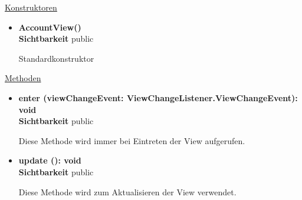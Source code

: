 \underline{Konstruktoren}
\begin{itemize}
\itemsep0pt
\item \textbf{AccountView()} \hfill\\
\textbf{Sichtbarkeit} public

Standardkonstruktor
\end{itemize}

\underline{Methoden}
\begin{itemize}
\itemsep0pt
\item \textbf{enter (viewChangeEvent: ViewChangeListener.ViewChangeEvent): void}\hfill\\
\textbf{Sichtbarkeit} public

Diese Methode wird immer bei Eintreten der View aufgerufen.

\item \textbf{update (): void}\hfill\\
\textbf{Sichtbarkeit} public

Diese Methode wird zum Aktualisieren der View verwendet.

\end{itemize}
